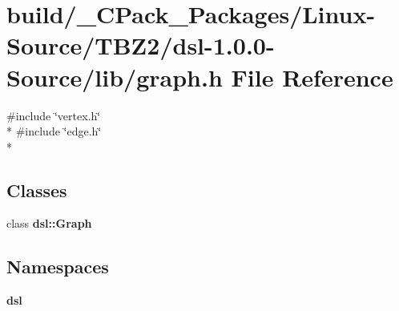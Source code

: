 \section{build/\-\_\-\-C\-Pack\-\_\-\-Packages/\-Linux-\/\-Source/\-T\-B\-Z2/dsl-\/1.0.0-\/\-Source/lib/graph.h File Reference}
\label{build_2__CPack__Packages_2Linux-Source_2TBZ2_2dsl-1_80_80-Source_2lib_2graph_8h}
{\ttfamily \#include \char`\"{}vertex.\-h\char`\"{}}\\*
{\ttfamily \#include \char`\"{}edge.\-h\char`\"{}}\\*
\subsection*{Classes}
\begin{DoxyCompactItemize}
\item 
class {\bf dsl\-::\-Graph}
\end{DoxyCompactItemize}
\subsection*{Namespaces}
\begin{DoxyCompactItemize}
\item 
{\bf dsl}
\end{DoxyCompactItemize}
